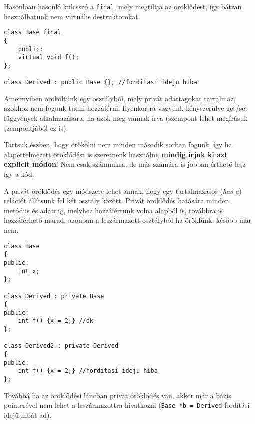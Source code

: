 \documentclass[a4paper,11.5pt]{article}
\begin{document}
	\smallskip
	Hasonlóan hasonló kulcsszó a \texttt{final}, mely megtiltja az öröklődést, így bátran használhatunk nem virtuális destruktorokat.
	
	\begin{lstlisting}
class Base final
{
	public:
	virtual void f();
};

class Derived : public Base {}; //forditasi ideju hiba
	\end{lstlisting}
	Amennyiben örököltünk egy osztályból, mely privát adattagokat tartalmaz, azokhoz nem fogunk tudni hozzáférni. Ilyenkor rá vagyunk kényszerülve get/set függvények alkalmazására, ha azok meg vannak írva (szempont lehet megírásuk szempontjából ez is).
	
	\medskip
	Tartsuk észben, hogy örökölni nem minden második sorban fogunk, így ha alapértelmezett öröklődést is szeretnénk használni, \textbf{mindig írjuk ki azt explicit módon}! Nem csak számunkra, de más számára is jobban érthető lesz így a kód.
	
	\medskip
	A privát öröklődés egy módszere lehet annak, hogy egy tartalmazásos (\textit{has a}) relációt állítsunk fel két osztály között. Privát öröklődés hatására minden metódus és adattag, melyhez hozzáfértünk volna alapból is, továbbra is hozzáférhető marad, azonban a leszármazott osztályból ha öröklünk, később már nem.
	\begin{lstlisting}
class Base
{
public:
	int x;
};

class Derived : private Base
{
public:
	int f() {x = 2;} //ok
};

class Derived2 : private Derived
{
public:
	int f() {x = 2;} //forditasi ideju hiba
};
	\end{lstlisting}
	Továbbá ha az öröklődési láncban privát öröklődés van, akkor már a bázis pointerével nem lehet a leszármazottra hivatkozni (\texttt{Base *b = Derived} fordítási idejű hibát ad).
	\medskip
	
\end{document}
